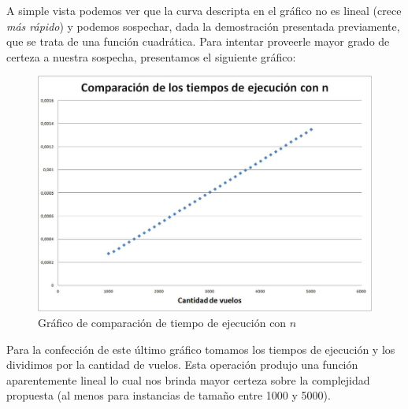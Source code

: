 \documentclass[11pt, a4paper, twoside]{article}
\begin{document}
A simple vista podemos ver que la curva descripta en el gráfico no es lineal (crece \textit{más rápido}) y podemos sospechar, dada la demostración presentada previamente, que se trata de una función cuadrática. Para intentar proveerle mayor grado de certeza a nuestra sospecha, presentamos el siguiente gráfico:

\begin{figure}[H]
\centering
\includegraphics[scale=0.5]{imagenes/graphn.jpg}
\caption{Gráfico de comparación de tiempo de ejecución con $n$}
\end{figure}

Para la confección de este último gráfico tomamos los tiempos de ejecución y los dividimos por la cantidad de vuelos. Esta operación produjo una función aparentemente lineal lo cual nos brinda mayor certeza sobre la complejidad propuesta (al menos para instancias de tamaño entre 1000 y 5000).


\end{document}
